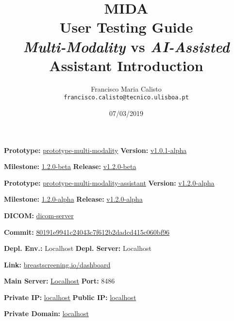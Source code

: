 \documentclass{article}
\title{
MIDA
\\
User Testing Guide
\\
\textit{Multi-Modality} vs \textit{AI-Assisted}
\\
Assistant Introduction
}
\author{
Francisco Maria Calisto\\
\texttt{francisco.calisto@tecnico.ulisboa.pt}
}
\date{07/03/2019}
\begin{document}
\maketitle

\textbf{Prototype:} \hyperlink{https://github.com/MIMBCD-UI/prototype-multi-modality}{prototype-multi-modality} \hfill \textbf{Version:} \hyperlink{https://github.com/MIMBCD-UI/prototype-multi-modality/releases/tag/v1.0.1-alpha}{v1.0.1-alpha}

\textbf{Milestone:} \hyperlink{https://github.com/MIMBCD-UI/prototype-breast-screening/milestone/1}{1.2.0-beta} \hfill \textbf{Release:} \hyperlink{https://github.com/MIMBCD-UI/prototype-breast-screening/releases/tag/v1.2.0-beta}{v1.2.0-beta}

\hfill

\textbf{Prototype:} \hyperlink{https://github.com/mida-project/prototype-multi-modality-assistant}{prototype-multi-modality-assistant} \hfill \textbf{Version:} \hyperlink{https://github.com/mida-project/prototype-multi-modality-assistant/releases/tag/v1.2.0-alpha}{v1.2.0-alpha}

\textbf{Milestone:} \hyperlink{https://github.com/mida-project/prototype-multi-modality-assistant/milestone/2}{1.2.0-alpha} \hfill \textbf{Release:} \hyperlink{https://github.com/mida-project/prototype-multi-modality-assistant/releases/tag/v1.2.0-alpha}{v1.2.0-alpha}

\hfill

\textbf{DICOM:} \hyperlink{https://github.com/MIMBCD-UI/dicom-server}{dicom-server}

\textbf{Commit:} \hyperlink{https://github.com/MIMBCD-UI/dicom-server/tree/80191e9941c24043c7f612b2dadcd415c060bf96}{80191e9941c24043c7f612b2dadcd415c060bf96}

\hfill

\textbf{Depl. Env.:} Localhost \hfill \textbf{Depl. Server:} Localhost

\textbf{Link:} \hyperlink{http://www.breastscreening.io/dashboard/}{breastscreening.io/dashboard}

\hfill

\textbf{Main Server:} \hyperlink{http://localhost:8486/src/public/index.html}{Localhost} \hfill \textbf{Port:} 8486

\textbf{Private IP:} \hyperlink{http://localhost:8486/src/public/index.html}{localhost} \hfill \textbf{Public IP:} \hyperlink{http://localhost:8486/src/public/index.html}{localhost}

\textbf{Private Domain:} \hyperlink{http://localhost:8486/src/public/index.html}{localhost}
\end{document}

